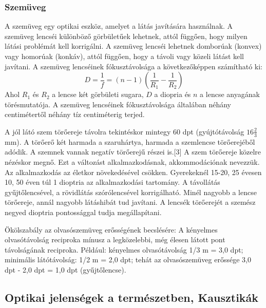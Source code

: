 \documentclass[a4paper,12pt]{article}
\begin{document}
\subsubsection{Szemüveg}
A szemüveg egy optikai eszköz, amelyet a látás javítására használnak. A szemüveg lencséi különböző görbületűek lehetnek, attól függően, hogy milyen látási problémát kell korrigálni. A szemüveg lencséi lehetnek domborúak (konvex) vagy homorúak (konkáv), attól függően, hogy a távoli vagy közeli látást kell javítani.
A szemüveg lencséinek fókusztávolsága a következőképpen számítható ki:
\begin{equation}
    D = \frac{1}{f} = (n - 1) \left(\frac{1}{R_1} - \frac{1}{R_2}\right)
\end{equation}
Ahol $R_1$ és $R_2$ a lencse két görbületi sugara, $D$ a diopria és $n$ a lencse anyagának törésmutatója. A szemüveg lencséinek fókusztávolsága általában néhány centimétertől néhány tíz centiméterig terjed.

A jól látó szem törőereje távolra tekintéskor mintegy 60 dpt (gyújtótávolság $16 \frac{2}{3}$ mm). A törőerő két harmada a szaruhártya, harmada a szemlencse törőerejéből adódik. A szemnek vannak negatív törőerejű részei is.[3] A szem törőereje közelre nézéskor megnő. Ezt a változást alkalmazkodásnak, akkommodációnak nevezzük. Az alkalmazkodás az életkor növekedésével csökken. Gyerekeknél 15-20, 25 évesen 10, 50 éven túl 1 dioptria az alkalmazkodási tartomány.
A távollátás gyűjtőlencsével, a rövidlátás szórólencsével korrigálható. Minél nagyobb a lencse törőereje, annál nagyobb látáshibát tud javítani. A lencsék törőerejét a szemész negyed dioptria pontossággal tudja megállapítani.

Ökölszabály az olvasószemüveg erősségének becslésére: A kényelmes olvasótávolság reciproka mínusz a legközelebbi, még élesen látott pont távolságának reciproka.
Például: kényelmes olvasótávolság 1/3 m = 3,0 dpt; minimális látótávolság: 1/2 m = 2,0 dpt; tehát az olvasószemüveg erőssége 3,0 dpt - 2,0 dpt = 1,0 dpt (gyűjtőlencse). 
\subsection{Optikai jelenségek a természetben, Kausztikák}
\end{document}
